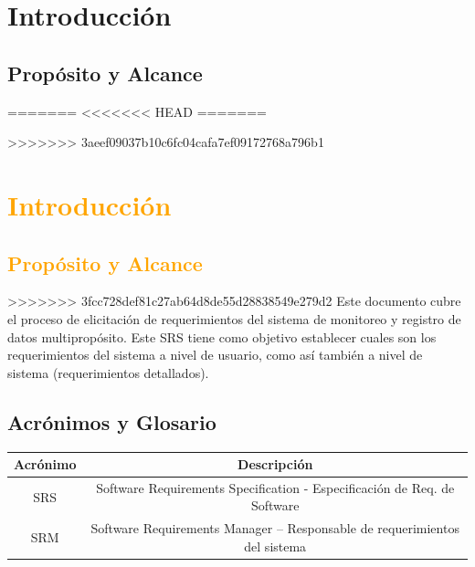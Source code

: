 \newpage
\section{\textcolor[gray]{.2}{Introducción}}
\subsection{\textcolor[gray]{.2}{Propósito y Alcance}}
=======
<<<<<<< HEAD
=======

\newpage
>>>>>>> 3aeef09037b10c6fc04cafa7ef09172768a796b1
\section{\textcolor{orange}{Introducción}}
\subsection{\textcolor{orange}{Propósito y Alcance}}
>>>>>>> 3fcc728def81c27ab64d8de55d28838549e279d2
Este documento cubre el proceso de elicitación de requerimientos del sistema
de monitoreo y registro de datos multipropósito. Este SRS tiene como objetivo
establecer cuales son los requerimientos del sistema a nivel de usuario, como
así también a nivel de sistema (requerimientos detallados). 

\subsection{\textcolor[gray]{.2}{Acrónimos y Glosario}}
\begin{table}[h!]
\begin{center}
\begin{tabular}{|c|c|}
\hline
\rowcolor[gray]{.8} Acrónimo & Descripción \\
\hline
SRS & Software Requirements Specification - Especificación de Req. de Software \\
\hline
SRM & Software Requirements  Manager – Responsable de requerimientos del sistema\\
\hline
\end{tabular}
\end{center}
\end{table}

